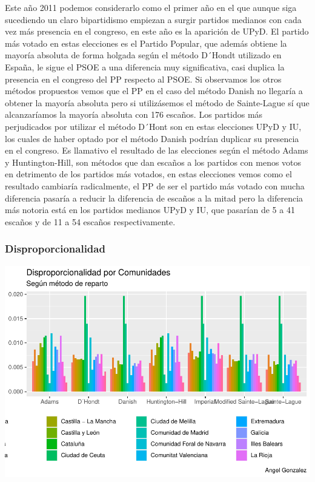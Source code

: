 \documentclass[12pt,a4paper,]{book}
\numberwithin{dummy}{section}
\theoremstyle{ocrenumbox}
\theoremstyle{blacknumex}
\theoremstyle{blacknumbox}
\theoremstyle{ocrenum}
\theoremstyle{ocrenum}
\begin{document}
Este año 2011 podemos considerarlo como el primer año en el que aunque
siga sucediendo un claro bipartidismo empiezan a surgir partidos
medianos con cada vez más presencia en el congreso, en este año es la
aparición de UPyD. El partido más votado en estas elecciones es el
Partido Popular, que además obtiene la mayoría absoluta de forma holgada
según el método D´Hondt utilizado en España, le sigue el PSOE a una
diferencia muy significativa, casi duplica la presencia en el congreso
del PP respecto al PSOE. Si observamos los otros métodos propuestos
vemos que el PP en el caso del método Danish no llegaría a obtener la
mayoría absoluta pero si utilizásemos el método de Sainte-Lague sí que
alcanzaríamos la mayoría absoluta con 176 escaños. Los partidos más
perjudicados por utilizar el método D´Hont son en estas elecciones UPyD
y IU, los cuales de haber optado por el método Danish podrían duplicar
su presencia en el congreso. Es llamativo el resultado de las elecciones
según el método Adams y Huntington-Hill, son métodos que dan escaños a
los partidos con menos votos en detrimento de los partidos más votados,
en estas elecciones vemos como el resultado cambiaría radicalmente, el
PP de ser el partido más votado con mucha diferencia pasaría a reducir
la diferencia de escaños a la mitad pero la diferencia más notoria está
en los partidos medianos UPyD y IU, que pasarían de 5 a 41 escaños y de
11 a 54 escaños respectivamente.

\hypertarget{disproporcionalidad-9}{%
\subsubsection{Disproporcionalidad}\label{disproporcionalidad-9}}

\begin{center}\includegraphics[width=0.95\linewidth]{figurasR/unnamed-chunk-102-1} \end{center}
\end{document}

